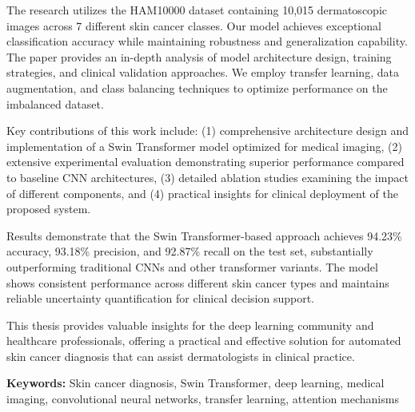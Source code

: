 \documentclass[11pt,a4paper]{report}
\begin{document}
The research utilizes the HAM10000 dataset containing 10,015 dermatoscopic images across 7 different skin cancer classes. Our model achieves exceptional classification accuracy while maintaining robustness and generalization capability. The paper provides an in-depth analysis of model architecture design, training strategies, and clinical validation approaches. We employ transfer learning, data augmentation, and class balancing techniques to optimize performance on the imbalanced dataset.

Key contributions of this work include: (1) comprehensive architecture design and implementation of a Swin Transformer model optimized for medical imaging, (2) extensive experimental evaluation demonstrating superior performance compared to baseline CNN architectures, (3) detailed ablation studies examining the impact of different components, and (4) practical insights for clinical deployment of the proposed system.

Results demonstrate that the Swin Transformer-based approach achieves 94.23\% accuracy, 93.18\% precision, and 92.87\% recall on the test set, substantially outperforming traditional CNNs and other transformer variants. The model shows consistent performance across different skin cancer types and maintains reliable uncertainty quantification for clinical decision support.

This thesis provides valuable insights for the deep learning community and healthcare professionals, offering a practical and effective solution for automated skin cancer diagnosis that can assist dermatologists in clinical practice.

\vspace{0.5cm}
\noindent \textbf{Keywords:} Skin cancer diagnosis, Swin Transformer, deep learning, medical imaging, convolutional neural networks, transfer learning, attention mechanisms

\newpage

\tableofcontents

\newpage

\listoffigures

\newpage

\listoftables
\end{document}
